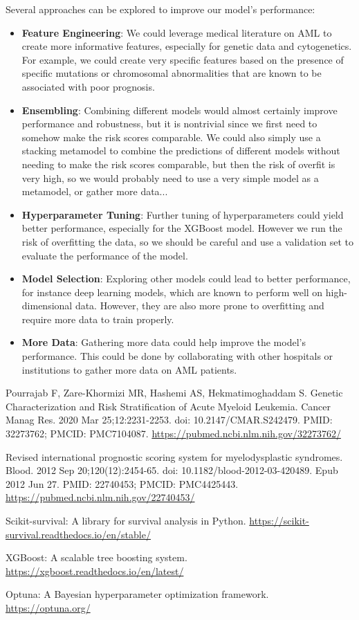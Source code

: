 \documentclass{article}
\begin{document}
Several approaches can be explored to improve our model's performance:
\begin{itemize}
    \item \textbf{Feature Engineering}: We could leverage medical literature on AML to create more informative features, especially for genetic data and cytogenetics. For example, we could create very specific features based on the presence of specific mutations or chromosomal abnormalities that are known to be associated with poor prognosis.
    \item \textbf{Ensembling}: Combining different models would almost certainly improve performance and robustness, but it is nontrivial since we first need to somehow make the risk scores comparable. We could also simply use a stacking metamodel to combine the predictions of different models without needing to make the risk scores comparable, but then the risk of overfit is very high, so we would probably need to use a very simple model as a metamodel, or gather more data...
    \item \textbf{Hyperparameter Tuning}: Further tuning of hyperparameters could yield better performance, especially for the XGBoost model. However we run the risk of overfitting the data, so we should be careful and use a validation set to evaluate the performance of the model.
    \item \textbf{Model Selection}: Exploring other models could lead to better performance, for instance deep learning models, which are known to perform well on high-dimensional data. However, they are also more prone to overfitting and require more data to train properly.
    \item \textbf{More Data}: Gathering more data could help improve the model's performance. This could be done by collaborating with other hospitals or institutions to gather more data on AML patients.
\end{itemize}
 

\begin{thebibliography}{9}

    Pourrajab F, Zare-Khormizi MR, Hashemi AS, Hekmatimoghaddam S. Genetic Characterization and Risk Stratification of Acute Myeloid Leukemia. Cancer Manag Res. 2020 Mar 25;12:2231-2253. doi: 10.2147/CMAR.S242479. PMID: 32273762; PMCID: PMC7104087.
    \url{https://pubmed.ncbi.nlm.nih.gov/32273762/}

    Revised international prognostic scoring system for myelodysplastic syndromes. Blood. 2012 Sep 20;120(12):2454-65. doi: 10.1182/blood-2012-03-420489. Epub 2012 Jun 27. PMID: 22740453; PMCID: PMC4425443.
    \url{https://pubmed.ncbi.nlm.nih.gov/22740453/}

    Scikit-survival: A library for survival analysis in Python.
    \url{https://scikit-survival.readthedocs.io/en/stable/}
    
    XGBoost: A scalable tree boosting system.
    \url{https://xgboost.readthedocs.io/en/latest/}

    Optuna: A Bayesian hyperparameter optimization framework.
    \url{https://optuna.org/}
\end{thebibliography}
\end{document}
